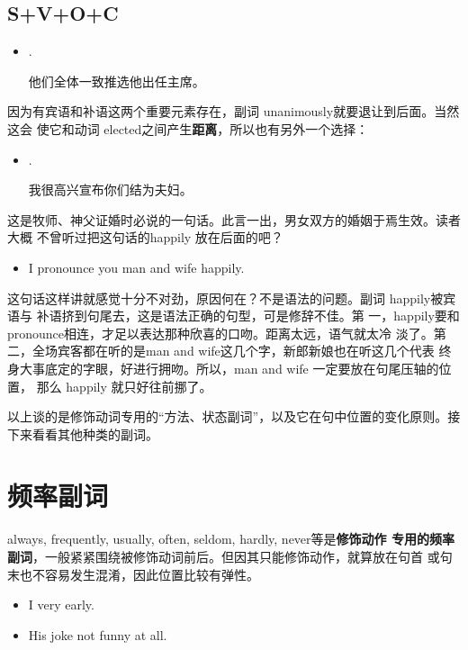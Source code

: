 \subsection{S+V+O+C}

\begin{itemize}
\item  {}    .

  他们全体一致推选他出任主席。
\end{itemize}
因为有宾语和补语这两个重要元素存在，副词 unanimously就要退让到后面。当然这会
使它和动词 elected之间产生\textbf{距离}，所以也有另外一个选择：
\begin{itemize}
\item  {}    .

  我很高兴宣布你们结为夫妇。
\end{itemize}
这是牧师、神父证婚时必说的一句话。此言一出，男女双方的婚姻于焉生效。读者大概
不曾听过把这句话的happily 放在后面的吧？
\begin{itemize}
\item  I pronounce you man and wife happily.
\end{itemize}
这句话这样讲就感觉十分不对劲，原因何在？不是语法的问题。副词 happily被宾语与
补语挤到句尾去，这是语法正确的句型，可是修辞不佳。第
一，happily要和 pronounce相连，才足以表达那种欣喜的口吻。距离太远，语气就太冷
淡了。第二，全场宾客都在听的是man and wife这几个字，新郎新娘也在听这几个代表
终身大事底定的字眼，好进行拥吻。所以，man and wife 一定要放在句尾压轴的位置，
那么 happily 就只好往前挪了。

以上谈的是修饰动词专用的“方法、状态副词”，以及它在句中位置的变化原则。接下来看看其他种类的副词。

\section{频率副词}

always, frequently, usually, often, seldom, hardly, never等是\textbf{修饰动作
  专用的频率副词}，一般紧紧围绕被修饰动词前后。但因其只能修饰动作，就算放在句首
或句末也不容易发生混淆，因此位置比较有弹性。

\begin{itemize}
\item I  very early.

\item His joke  not funny at all.
\end{itemize}


